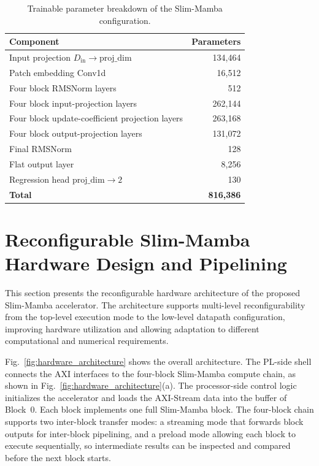 \documentclass[lettersize,journal]{IEEEtran}
\begin{document}
\begin{table}[!t]
\caption{Trainable parameter breakdown of the Slim-Mamba configuration.}
\label{tab:slim_param_breakdown_tcas}
\begin{center}
\footnotesize
\setlength{\tabcolsep}{6pt}
\renewcommand{\arraystretch}{1.08}
\begin{tabular}{|l|r|}
\hline
\textbf{Component} & \textbf{Parameters} \\
\hline
Input projection \(D_{\mathrm{in}}\rightarrow\text{proj\_dim}\) & 134,464 \\
\hline
Patch embedding Conv1d & 16,512 \\
\hline
Four block RMSNorm layers & 512 \\
\hline
Four block input-projection layers & 262,144 \\
\hline
Four block update-coefficient projection layers & 263,168 \\
\hline
Four block output-projection layers & 131,072 \\
\hline
Final RMSNorm & 128 \\
\hline
Flat output layer & 8,256 \\
\hline
Regression head \(\text{proj\_dim}\rightarrow 2\) & 130 \\
\hline
\textbf{Total} & \textbf{816,386} \\
\hline
\end{tabular}
\end{center}
\end{table}

\section{Reconfigurable Slim-Mamba Hardware Design and Pipelining}
\label{sec:reconfigurable_hw}

This section presents the reconfigurable hardware architecture of the proposed Slim-Mamba accelerator. The architecture supports multi-level reconfigurability from the top-level execution mode to the low-level datapath configuration, improving hardware utilization and allowing adaptation to different computational and numerical requirements.

Fig.~\ref{fig:hardware_architecture} shows the overall architecture. The PL-side shell connects the AXI interfaces to the four-block Slim-Mamba
compute chain, as shown in Fig.~\ref{fig:hardware_architecture}(a). The processor-side control logic initializes the accelerator and loads the AXI-Stream data into the buffer of Block~0. Each block implements one full Slim-Mamba block. The four-block chain supports two inter-block transfer modes: a streaming mode that forwards block outputs for inter-block pipelining, and a preload mode allowing each block to execute sequentially, so intermediate results can be inspected and compared before the next block starts.
\end{document}

